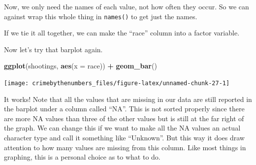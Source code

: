 \documentclass[
  12pt,
]{book}
\newenvironment{Shaded}{\begin{snugshade}}{\end{snugshade}}
\newcommand{\CommentTok}[1]{\textcolor[rgb]{0.37,0.37,0.37}{\textit{#1}}}
\newcommand{\DataTypeTok}[1]{\textcolor[rgb]{0.27,0.27,0.27}{#1}}
\newcommand{\KeywordTok}[1]{\textcolor[rgb]{0.27,0.27,0.27}{\textbf{#1}}}
\newcommand{\NormalTok}[1]{#1}
\newcommand{\OperatorTok}[1]{\textcolor[rgb]{0.43,0.43,0.43}{\textbf{#1}}}
\newcommand{\OtherTok}[1]{\textcolor[rgb]{0.37,0.37,0.37}{#1}}
\newcommand{\StringTok}[1]{\textcolor[rgb]{0.5,0.5,0.5}{#1}}
\begin{document}
Now, we only need the names of each value, not how often they occur. So we can against wrap this whole thing in \texttt{names()} to get just the names.

\begin{Shaded}
\end{Shaded}

If we tie it all together, we can make the ``race'' column into a factor variable.

\begin{Shaded}
\end{Shaded}

Now let's try that barplot again.

\begin{Shaded}
\begin{Highlighting}[]
\KeywordTok{ggplot}\NormalTok{(shootings, }\KeywordTok{aes}\NormalTok{(}\DataTypeTok{x =}\NormalTok{ race)) }\OperatorTok{+}\StringTok{ }
\StringTok{  }\KeywordTok{geom\_bar}\NormalTok{() }
\end{Highlighting}
\end{Shaded}

\begin{center}\texttt{[image: crimebythenumbers\_files/figure-latex/unnamed-chunk-27-1]} \end{center}

It works! Note that all the values that are missing in our data are still reported in the barplot under a column called ``NA''. This is not sorted properly since there are more NA values than three of the other values but is still at the far right of the graph. We can change this if we want to make all the NA values an actual character type and call it something like ``Unknown''. But this way it does draw attention to how many values are missing from this column. Like most things in graphing, this is a personal choice as to what to do.
\end{document}
